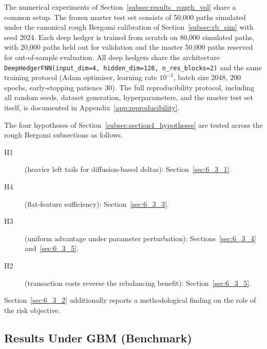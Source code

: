 \documentclass[12pt,a4paper]{article}
\theoremstyle{definition}
\theoremstyle{plain}
\theoremstyle{remark}
\theoremstyle{plain}
\begin{document}
The numerical experiments of Section~\ref{subsec:results_rough_vol}
share a common setup. The frozen master test set consists of 50{,}000
paths simulated under the canonical rough Bergomi calibration of
Section~\ref{subsec:rb_sim} with seed 2024. Each deep hedger is trained
from scratch on 80{,}000 simulated paths, with 20{,}000 paths held out
for validation and the master 50{,}000 paths reserved for out-of-sample
evaluation. All deep hedgers share the architecture
\texttt{DeepHedgerFNN(input\_dim=4, hidden\_dim=128, n\_res\_blocks=2)}
and the same training protocol (Adam optimiser, learning rate
$10^{-3}$, batch size 2048, 200 epochs, early-stopping patience 30).
The full reproducibility protocol, including all random seeds, dataset
generation, hyperparameters, and the master test set itself, is
documented in Appendix~\ref{app:reproducibility}.

The four hypotheses of Section~\ref{subsec:section4_hypotheses} are
tested across the rough Bergomi subsections as follows.
\begin{description}
  \item[H1] (heavier left tails for diffusion-based deltas):
        Section~\ref{sec:6_3_1}.
  \item[H4] (flat-feature sufficiency):
        Section~\ref{sec:6_3_3}.
  \item[H3] (uniform advantage under parameter perturbation):
        Sections~\ref{sec:6_3_4} and~\ref{sec:6_3_5}.
  \item[H2] (transaction costs reverse the rebalancing benefit):
        Section~\ref{sec:6_3_5}.
\end{description}
Section~\ref{sec:6_3_2} additionally reports a methodological
finding on the role of the risk objective.

\subsection{Results Under GBM (Benchmark)}
\label{subsec:results_gbm}
\end{document}
